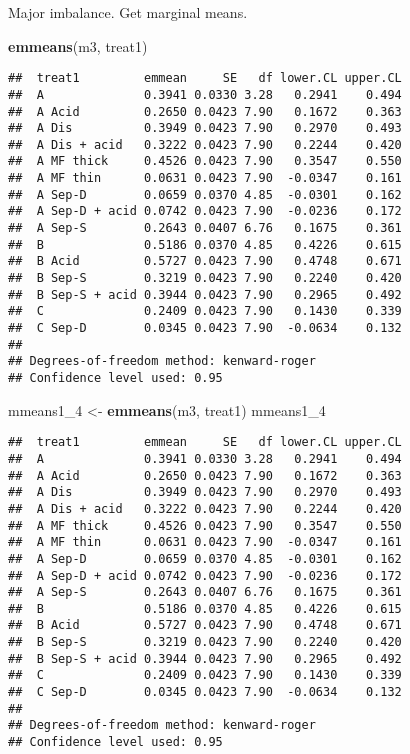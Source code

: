 \documentclass[
]{article}
\newenvironment{Shaded}{\begin{snugshade}}{\end{snugshade}}
\newcommand{\FunctionTok}[1]{\textcolor[rgb]{0.13,0.29,0.53}{\textbf{#1}}}
\newcommand{\NormalTok}[1]{#1}
\newcommand{\OtherTok}[1]{\textcolor[rgb]{0.56,0.35,0.01}{#1}}
\newcommand{\StringTok}[1]{\textcolor[rgb]{0.31,0.60,0.02}{#1}}
\begin{document}
Major imbalance. Get marginal means.

\begin{Shaded}
\begin{Highlighting}[]
\FunctionTok{emmeans}\NormalTok{(m3, }\StringTok{\textquotesingle{}treat1\textquotesingle{}}\NormalTok{)}
\end{Highlighting}
\end{Shaded}

\begin{verbatim}
##  treat1         emmean     SE   df lower.CL upper.CL
##  A              0.3941 0.0330 3.28   0.2941    0.494
##  A Acid         0.2650 0.0423 7.90   0.1672    0.363
##  A Dis          0.3949 0.0423 7.90   0.2970    0.493
##  A Dis + acid   0.3222 0.0423 7.90   0.2244    0.420
##  A MF thick     0.4526 0.0423 7.90   0.3547    0.550
##  A MF thin      0.0631 0.0423 7.90  -0.0347    0.161
##  A Sep-D        0.0659 0.0370 4.85  -0.0301    0.162
##  A Sep-D + acid 0.0742 0.0423 7.90  -0.0236    0.172
##  A Sep-S        0.2643 0.0407 6.76   0.1675    0.361
##  B              0.5186 0.0370 4.85   0.4226    0.615
##  B Acid         0.5727 0.0423 7.90   0.4748    0.671
##  B Sep-S        0.3219 0.0423 7.90   0.2240    0.420
##  B Sep-S + acid 0.3944 0.0423 7.90   0.2965    0.492
##  C              0.2409 0.0423 7.90   0.1430    0.339
##  C Sep-D        0.0345 0.0423 7.90  -0.0634    0.132
## 
## Degrees-of-freedom method: kenward-roger 
## Confidence level used: 0.95
\end{verbatim}

\begin{Shaded}
\begin{Highlighting}[]
\NormalTok{mmeans1\_4 }\OtherTok{\textless{}{-}} \FunctionTok{emmeans}\NormalTok{(m3, }\StringTok{\textquotesingle{}treat1\textquotesingle{}}\NormalTok{)}
\NormalTok{mmeans1\_4}
\end{Highlighting}
\end{Shaded}

\begin{verbatim}
##  treat1         emmean     SE   df lower.CL upper.CL
##  A              0.3941 0.0330 3.28   0.2941    0.494
##  A Acid         0.2650 0.0423 7.90   0.1672    0.363
##  A Dis          0.3949 0.0423 7.90   0.2970    0.493
##  A Dis + acid   0.3222 0.0423 7.90   0.2244    0.420
##  A MF thick     0.4526 0.0423 7.90   0.3547    0.550
##  A MF thin      0.0631 0.0423 7.90  -0.0347    0.161
##  A Sep-D        0.0659 0.0370 4.85  -0.0301    0.162
##  A Sep-D + acid 0.0742 0.0423 7.90  -0.0236    0.172
##  A Sep-S        0.2643 0.0407 6.76   0.1675    0.361
##  B              0.5186 0.0370 4.85   0.4226    0.615
##  B Acid         0.5727 0.0423 7.90   0.4748    0.671
##  B Sep-S        0.3219 0.0423 7.90   0.2240    0.420
##  B Sep-S + acid 0.3944 0.0423 7.90   0.2965    0.492
##  C              0.2409 0.0423 7.90   0.1430    0.339
##  C Sep-D        0.0345 0.0423 7.90  -0.0634    0.132
## 
## Degrees-of-freedom method: kenward-roger 
## Confidence level used: 0.95
\end{verbatim}
\end{document}
